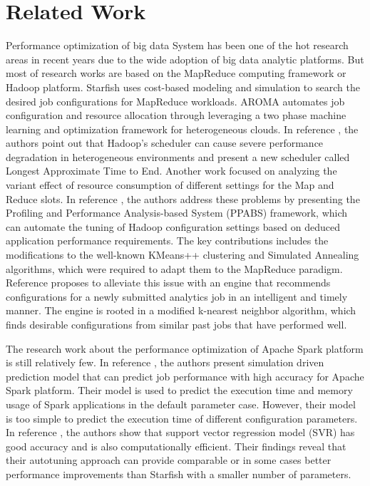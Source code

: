 \section{Related Work}\label{sec:related}
\par Performance optimization of big data System has been one of the hot research areas in recent years due to the wide adoption of big data analytic platforms. But most of research works are based on the MapReduce computing framework or Hadoop platform. Starfish \cite{starfish} uses cost-based modeling and simulation to search the desired job configurations for MapReduce workloads. AROMA \cite{AROMA} automates job configuration and resource allocation through leveraging a two phase machine learning and optimization framework for heterogeneous clouds. In reference \cite{zaharia2008Improving}, the authors point out that Hadoop's scheduler can cause severe performance
degradation in heterogeneous environments and present a new scheduler called Longest Approximate Time to End. Another work \cite{kambatla2009towards} focused on analyzing the variant effect of resource consumption of different settings for the Map and Reduce slots. In reference \cite{wu2013selftuning}, the authors address these problems by presenting the Profiling and Performance Analysis-based System (PPABS) framework, which can automate the tuning of Hadoop configuration settings based on deduced application performance requirements. The key contributions includes the modifications to the well-known KMeans++ clustering and Simulated Annealing algorithms, which were required to adapt them to the MapReduce paradigm. Reference \cite{zhang2015finding} proposes to alleviate this issue with an engine that recommends configurations for a newly submitted analytics job in an intelligent and timely manner. The engine is rooted in a modified k-nearest neighbor algorithm, which finds desirable configurations from similar past jobs that have performed well.

\par  The research work about the performance optimization of Apache Spark platform is still relatively few. In reference \cite{wang2015High}, the authors present simulation driven prediction model that can predict job performance with high accuracy for Apache Spark platform. Their model is used to predict the execution time and memory usage of Spark applications in the default parameter case. However, their model is too simple to
predict the execution time of different configuration parameters. In reference \cite{yigitbase2013towards}, the authors show that support vector regression model (SVR) has good accuracy and is also computationally efficient. Their findings reveal that their autotuning approach can provide comparable or in some cases better performance improvements than Starfish with a smaller number of parameters.
